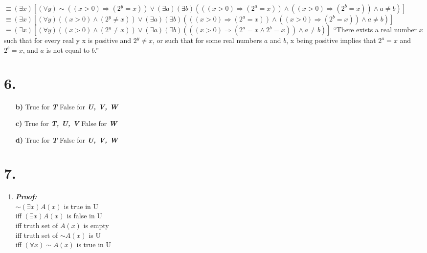 \documentclass[12pt,letterpaper]{article}
\begin{document}
\begin{enumerate}[label= \textbf{\alph*)}]
						$\equiv (\exists x) [(\forall y)\sim ((x > 0) \Rightarrow (2^y=x)) \lor (\exists a)(\exists b)(((x > 0) \Rightarrow (2^a=x)) \land ((x > 0) \Rightarrow (2^b=x)) \land a \neq b)]$\\
						$\equiv (\exists x) [(\forall y) ((x > 0) \land (2^y\neq x)) \lor (\exists a)(\exists b)(((x > 0) \Rightarrow (2^a=x)) \land ((x > 0) \Rightarrow (2^b=x)) \land a \neq b)]$\\
						$\equiv (\exists x) [(\forall y) ((x > 0) \land (2^y\neq x)) \lor (\exists a)(\exists b)(((x > 0) \Rightarrow (2^a=x \land 2^b=x)) \land a \neq b)]$
						``There exists a real number $x$ such that for every real y x is positive and $2^y\neq x$, or such that for some real numbers $a$ and $b$, x being positive implies that $2^a=x$ and $2^b=x$, and $a$ is not equal to $b$.''
\end{enumerate}

\section*{6.}
\begin{enumerate}[label= \textbf{\alph*)}]
	\item[\textbf{b)}] True for \textbf{\textit{T}}
						False for \textbf{\textit{U, V, W}}
	\item[\textbf{c)}] True for \textbf{\textit{T, U, V}}
						False for \textbf{\textit{W}}
	\item[\textbf{d)}]  True for \textbf{\textit{T}}
						False for \textbf{\textit{U, V, W}}
\end{enumerate}
\newpage
\section*{7.}
\begin{enumerate}[label= \textbf{\alph*)}]
	\item \textbf{\textit{Proof:}}\\
			$\sim (\exists x) A(x)$ is true in U\\
			iff $(\exists x) A(x)$ is false in U\\
			iff truth set of $A(x)$ is empty\\
			iff truth set of $\sim A(x)$ is U\\
			iff $(\forall x) \sim A(x)$ is true in U			
\end{enumerate}
 
\end{document}
